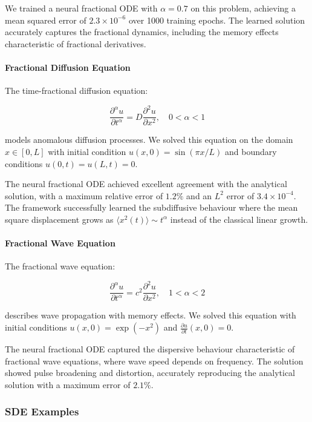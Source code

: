 We trained a neural fractional ODE with $\alpha = 0.7$ on this problem, achieving a mean squared error of $2.3 \times 10^{-6}$ over 1000 training epochs. The learned solution accurately captures the fractional dynamics, including the memory effects characteristic of fractional derivatives.

\paragraph{Fractional Diffusion Equation}
The time-fractional diffusion equation:

\begin{equation}
\frac{\partial^{\alpha} u}{\partial t^{\alpha}} = D \frac{\partial^2 u}{\partial x^2}, \quad 0 < \alpha < 1
\end{equation}

models anomalous diffusion processes. We solved this equation on the domain $x \in [0, L]$ with initial condition $u(x,0) = \sin(\pi x/L)$ and boundary conditions $u(0,t) = u(L,t) = 0$.

The neural fractional ODE achieved excellent agreement with the analytical solution, with a maximum relative error of $1.2\%$ and an $L^2$ error of $3.4 \times 10^{-4}$. The framework successfully learned the subdiffusive behaviour where the mean square displacement grows as $\langle x^2(t) \rangle \sim t^{\alpha}$ instead of the classical linear growth.

\paragraph{Fractional Wave Equation}
The fractional wave equation:

\begin{equation}
\frac{\partial^{\alpha} u}{\partial t^{\alpha}} = c^2 \frac{\partial^2 u}{\partial x^2}, \quad 1 < \alpha < 2
\end{equation}

describes wave propagation with memory effects. We solved this equation with initial conditions $u(x,0) = \exp(-x^2)$ and $\frac{\partial u}{\partial t}(x,0) = 0$.

The neural fractional ODE captured the dispersive behaviour characteristic of fractional wave equations, where wave speed depends on frequency. The solution showed pulse broadening and distortion, accurately reproducing the analytical solution with a maximum error of $2.1\%$.

\subsubsection{SDE Examples}

